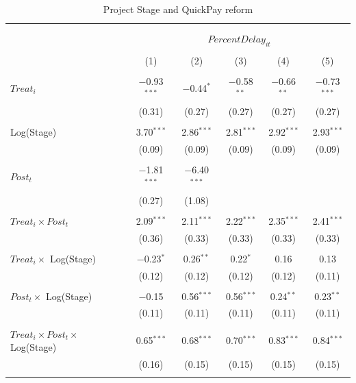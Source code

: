 \documentclass[
]{article}
\begin{document}
\begin{table}[H] \centering 
  \caption{Project Stage and QuickPay reform} 
  \label{} 
\small 
\begin{tabular}{@{\extracolsep{-2pt}}lccccc} 
\\[-1.8ex]\hline 
\hline \\[-1.8ex] 
\\[-1.8ex] & \multicolumn{5}{c}{$PercentDelay_{it}$  } \\ 
\\[-1.8ex] & (1) & (2) & (3) & (4) & (5)\\ 
\hline \\[-1.8ex] 
 $Treat_i$ & $-$0.93$^{***}$ & $-$0.44$^{*}$ & $-$0.58$^{**}$ & $-$0.66$^{**}$ & $-$0.73$^{***}$ \\ 
  & (0.31) & (0.27) & (0.27) & (0.27) & (0.27) \\ 
  & & & & & \\ 
 Log(Stage) & 3.70$^{***}$ & 2.86$^{***}$ & 2.81$^{***}$ & 2.92$^{***}$ & 2.93$^{***}$ \\ 
  & (0.09) & (0.09) & (0.09) & (0.09) & (0.09) \\ 
  & & & & & \\ 
 $Post_t$ & $-$1.81$^{***}$ & $-$6.40$^{***}$ &  &  &  \\ 
  & (0.27) & (1.08) &  &  &  \\ 
  & & & & & \\ 
 $Treat_i \times Post_t$ & 2.09$^{***}$ & 2.11$^{***}$ & 2.22$^{***}$ & 2.35$^{***}$ & 2.41$^{***}$ \\ 
  & (0.36) & (0.33) & (0.33) & (0.33) & (0.33) \\ 
  & & & & & \\ 
 $Treat_i \times$ Log(Stage) & $-$0.23$^{*}$ & 0.26$^{**}$ & 0.22$^{*}$ & 0.16 & 0.13 \\ 
  & (0.12) & (0.12) & (0.12) & (0.12) & (0.11) \\ 
  & & & & & \\ 
 $Post_t \times$ Log(Stage) & $-$0.15 & 0.56$^{***}$ & 0.56$^{***}$ & 0.24$^{**}$ & 0.23$^{**}$ \\ 
  & (0.11) & (0.11) & (0.11) & (0.11) & (0.11) \\ 
  & & & & & \\ 
 $Treat_i \times Post_t \times$ Log(Stage) & 0.65$^{***}$ & 0.68$^{***}$ & 0.70$^{***}$ & 0.83$^{***}$ & 0.84$^{***}$ \\ 
  & (0.16) & (0.15) & (0.15) & (0.15) & (0.15) \\ 
  & & & & & \\ 

\end{tabular}
\end{table}
\end{document}
